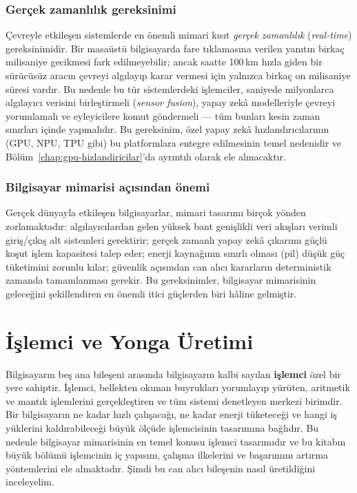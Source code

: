 \subsubsection*{Gerçek zamanlılık gereksinimi}
Çevreyle etkileşen sistemlerde en önemli mimari kısıt \emph{gerçek zamanlılık} (\emph{real-time}) gereksinimidir. Bir masaüstü bilgisayarda fare tıklamasına verilen yanıtın birkaç milisaniye gecikmesi fark edilmeyebilir; ancak saatte 100\,km hızla giden bir sürücüsüz aracın çevreyi algılayıp karar vermesi için yalnızca birkaç on milisaniye süresi vardır. Bu nedenle bu tür sistemlerdeki işlemciler, saniyede milyonlarca algılayıcı verisini birleştirmeli (\emph{sensor fusion}), yapay zekâ modelleriyle çevreyi yorumlamalı ve eyleyicilere komut göndermeli --- tüm bunları kesin zaman sınırları içinde yapmalıdır. Bu gereksinim, özel yapay zekâ hızlandırıcılarının (GPU, NPU, TPU gibi) bu platformlara entegre edilmesinin temel nedenidir ve Bölüm~\ref{chap:gpu-hizlandiricilar}'da ayrıntılı olarak ele alınacaktır.

\subsubsection*{Bilgisayar mimarisi açısından önemi}
Gerçek dünyayla etkileşen bilgisayarlar, mimari tasarımı birçok yönden zorlamaktadır: algılayıcılardan gelen yüksek bant genişlikli veri akışları verimli giriş/çıkış alt sistemleri gerektirir; gerçek zamanlı yapay zekâ çıkarımı güçlü koşut işlem kapasitesi talep eder; enerji kaynağının sınırlı olması (pil) düşük güç tüketimini zorunlu kılar; güvenlik açısından can alıcı kararların deterministik zamanda tamamlanması gerekir. Bu gereksinimler, bilgisayar mimarisinin geleceğini şekillendiren en önemli itici güçlerden biri hâline gelmiştir.


\section{İşlemci ve Yonga Üretimi}
\label{sec:islemci}

Bilgisayarın beş ana bileşeni arasında bilgisayarın kalbi sayılan \textbf{işlemci} özel bir yere sahiptir. İşlemci, bellekten okunan buyrukları yorumlayıp yürüten, aritmetik ve mantık işlemlerini gerçekleştiren ve tüm sistemi denetleyen merkezi birimdir. Bir bilgisayarın ne kadar hızlı çalışacağı, ne kadar enerji tüketeceği ve hangi iş yüklerini kaldırabileceği büyük ölçüde işlemcisinin tasarımına bağlıdır. Bu nedenle bilgisayar mimarisinin en temel konusu işlemci tasarımıdır ve bu kitabın büyük bölümü işlemcinin iç yapısını, çalışma ilkelerini ve başarımını artırma yöntemlerini ele almaktadır. Şimdi bu can alıcı bileşenin nasıl üretildiğini inceleyelim.

